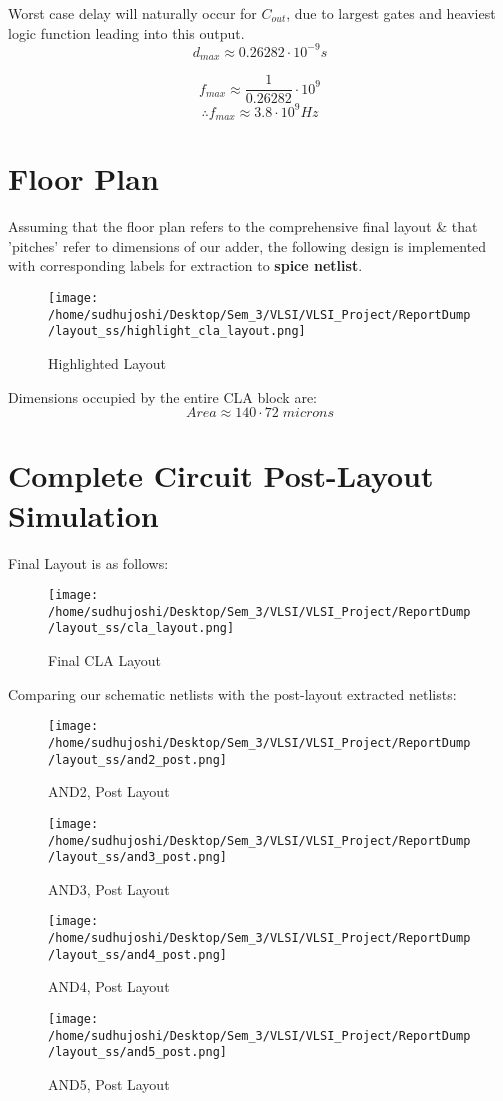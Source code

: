 \documentclass[conference]{IEEEtran}
\begin{document}
Worst case delay will naturally occur for \( C_{out}\), due to largest gates and heaviest
logic function leading into this output.
\[
d_{max} \approx 0.26282\cdot10^{-9}s
\]

\[
f_{max} \approx \frac{1}{0.26282} \cdot 10^{9}
\]
\[
\therefore f_{max} \approx 3.8\cdot 10^{9} Hz
\]


\section{Floor Plan}
Assuming that the floor plan refers to the comprehensive final layout \& that 'pitches' 
refer to dimensions of our adder, the following design is implemented with corresponding 
labels for extraction to \textbf{spice netlist}.
\begin{figure}[H] 
    \centering
    \texttt{[image: /home/sudhujoshi/Desktop/Sem\_3/VLSI/VLSI\_Project/ReportDump/layout\_ss/highlight\_cla\_layout.png]}
    \caption{Highlighted Layout} 
\end{figure}

Dimensions occupied by the entire CLA block are:
\[
Area \approx 140\cdot72\;microns
\]

\section{Complete Circuit Post-Layout Simulation}
Final Layout is as follows:
\begin{figure}[H] 
    \centering
    \texttt{[image: /home/sudhujoshi/Desktop/Sem\_3/VLSI/VLSI\_Project/ReportDump/layout\_ss/cla\_layout.png]}
    \caption{Final CLA Layout} 
\end{figure}
Comparing our schematic netlists with the post-layout extracted netlists:

\begin{figure}[H] 
    \centering
    \texttt{[image: /home/sudhujoshi/Desktop/Sem\_3/VLSI/VLSI\_Project/ReportDump/layout\_ss/and2\_post.png]}
    \caption{AND2, Post Layout} 
\end{figure}
\begin{figure}[H] 
    \centering
    \texttt{[image: /home/sudhujoshi/Desktop/Sem\_3/VLSI/VLSI\_Project/ReportDump/layout\_ss/and3\_post.png]}
    \caption{AND3, Post Layout} 
\end{figure}
\begin{figure}[H] 
    \centering
    \texttt{[image: /home/sudhujoshi/Desktop/Sem\_3/VLSI/VLSI\_Project/ReportDump/layout\_ss/and4\_post.png]}
    \caption{AND4, Post Layout} 
\end{figure}
\begin{figure}[H] 
    \centering
    \texttt{[image: /home/sudhujoshi/Desktop/Sem\_3/VLSI/VLSI\_Project/ReportDump/layout\_ss/and5\_post.png]}
    \caption{AND5, Post Layout} 
\end{figure}
\end{document}
